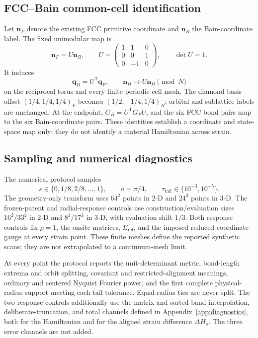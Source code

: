 \documentclass[11pt]{article}
\begin{document}
\subsection{FCC--Bain common-cell identification}

Let $\mathbf n_F$ denote the existing FCC primitive coordinate and $\mathbf n_B$ the
Bain-coordinate label. The fixed unimodular map is
\begin{equation}
 \mathbf n_F=U\mathbf n_B,
 \qquad
 U=\begin{pmatrix}
 1&1&0\\
 0&0&1\\
 0&-1&0
 \end{pmatrix},
 \qquad \det U=1.
 \label{eq:strain-common-cell-map}
\end{equation}
It induces
\begin{equation}
 \mathbf q_B=U^{\mathsf T}\mathbf q_F,
 \qquad
 \mathbf n_B\longmapsto U\mathbf n_B\pmod N
 \label{eq:strain-reciprocal-cell-map}
\end{equation}
on the reciprocal torus and every finite periodic cell mesh. The diamond basis offset
$(1/4,1/4,1/4)_F$ becomes $(1/2,-1/4,1/4)_B$; orbital and sublattice labels are
unchanged. At the endpoint, $G_B=U^{\mathsf T}G_FU$, and the six FCC bond pairs map to
the six Bain-coordinate pairs. These identities establish a coordinate and state-space
map only; they do not identify a material Hamiltonian across strain.

\subsection{Sampling and numerical diagnostics}

The numerical protocol samples
\begin{equation}
 s\in\{0,1/8,2/8,\ldots,1\},
 \qquad a=\pi/4,
 \qquad \tau_{\mathrm{tail}}\in\{10^{-3},10^{-5}\}.
 \label{eq:strain-frozen-samples}
\end{equation}
The geometry-only transform uses $64^2$ points in 2-D and $24^3$ points in 3-D. The
frozen-parent and radial-response controls use construction/evaluation sizes
$16^2/33^2$ in 2-D and $8^3/17^3$ in 3-D, with evaluation shift $1/3$. Both response
controls fix $\rho=1$, the onsite matrices, $E_{\mathrm{ref}}$, and the imposed
reduced-coordinate gauge at every strain point. These finite meshes define the reported
synthetic scans; they are not extrapolated to a continuum-mesh limit.

At every point the protocol reports the unit-determinant metric, bond-length extrema and
orbit splitting, covariant and restricted-alignment meanings, ordinary and centered
Nyquist Fourier power, and the first complete physical-radius support meeting each tail
tolerance. Equal-radius ties are never split. The two response controls additionally use
the matrix and sorted-band interpolation, deliberate-truncation, and total channels
defined in Appendix~\ref{app:diagnostics}, both for the Hamiltonian and for the aligned
strain difference $\Delta H_s$. The three error channels are not added.
\end{document}
